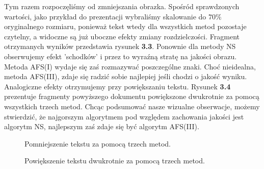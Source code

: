 Tym razem rozpoczęliśmy od zmniejszania obrazka. Spośród sprawdzonych wartości,
jako przykład do prezentacji wybraliśmy skalowanie do $70\%$ oryginalnego
rozmiaru, ponieważ tekst wtedy dla wszystkich metod pozostaje czytelny, a
widoczne są już uboczne efekty zmiany rozdzielczości. Fragment otrzymanych
wyników przedstawia rysunek \textbf{3.3}. Ponownie dla metody NS obserwujemy
efekt 'schodków' i przez to wyraźną stratę na jakości obrazu. Metoda AFS(I)
wydaje się zaś rozmazywać poszczególne znaki. Choć nieidealna, metoda AFS(III),
zdaje się radzić sobie najlepiej jeśli chodzi o jakość wyniku. Analogiczne efekty
otrzymujemy przy powiększaniu tekstu. Rysunek \textbf{3.4} prezentuje
fragmenty powyższego dokumentu powiększone dwukrotnie za pomocą wszystkich trzech metod. Chcąc
podsumować nasze wizualne obserwacje, możemy stwierdzić, że najgorszym algorytmem pod względem zachowania
jakości jest algorytm NS, najlepszym zaś zdaje się być algorytm AFS(III).
\begin{figure}[h!tb]
\begin{center}
\caption{Pomniejszenie tekstu za pomocą trzech metod.}
\end{center}
\end{figure}
\begin{figure}
\begin{center}
\caption{Powiększenie tekstu dwukrotnie za pomocą trzech metod.}
\end{center}
\end{figure}

